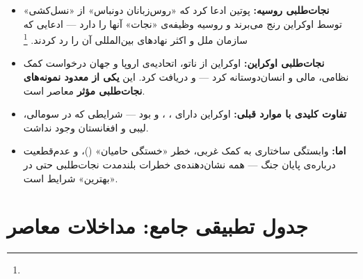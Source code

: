 \begin{tcolorbox}[casebox, title={اوکراین: نجات‌طلبی دوسویه}]
\begin{itemize}[nosep, rightmargin=1em]
  \item \textbf{نجات‌طلبی روسیه:} پوتین ادعا کرد که «روس‌زبانان دونباس» از «نسل‌کشی» توسط اوکراین رنج می‌برند و روسیه وظیفه‌ی «نجات» آنها را دارد — ادعایی که سازمان ملل و اکثر نهادهای بین‌المللی آن را رد کردند.%
  \footnote{}

  \item \textbf{نجات‌طلبی اوکراین:} اوکراین از ناتو، اتحادیه‌ی اروپا و جهان درخواست کمک نظامی، مالی و انسان‌دوستانه کرد — و دریافت کرد. این \textbf{یکی از معدود نمونه‌های نجات‌طلبی مؤثر} معاصر است.

  \item \textbf{تفاوت کلیدی با موارد قبلی:} اوکراین دارای ، ،  و  بود — شرایطی که در سومالی، لیبی و افغانستان وجود نداشت.

  \item \textbf{اما:} وابستگی ساختاری به کمک غربی، خطر «خستگی حامیان» ()، و عدم‌قطعیت درباره‌ی پایان جنگ — همه نشان‌دهنده‌ی خطرات بلندمدت نجات‌طلبی حتی در «بهترین» شرایط است.
\end{itemize}
\end{tcolorbox}

\section{جدول تطبیقی جامع: مداخلات معاصر}
\label{sec:ch10-comprehensive-table}

